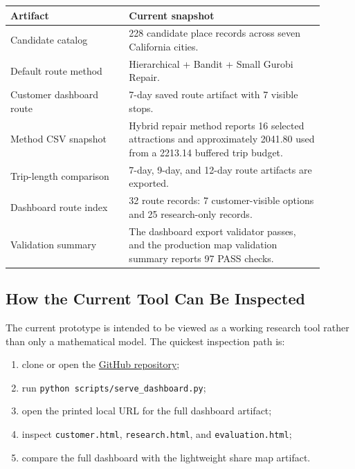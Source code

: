 \documentclass[11pt,a4paper]{article}
\begin{document}
\begin{center}
\begin{tabular}{p{0.34\linewidth} p{0.56\linewidth}}
\hline
\textbf{Artifact} & \textbf{Current snapshot} \\
\hline
Candidate catalog & 228 candidate place records across seven California cities. \\
Default route method & Hierarchical + Bandit + Small Gurobi Repair. \\
Customer dashboard route & 7-day saved route artifact with 7 visible stops. \\
Method CSV snapshot & Hybrid repair method reports 16 selected attractions and approximately 2041.80 used from a 2213.14 buffered trip budget. \\
Trip-length comparison & 7-day, 9-day, and 12-day route artifacts are exported. \\
Dashboard route index & 32 route records: 7 customer-visible options and 25 research-only records. \\
Validation summary & The dashboard export validator passes, and the production map validation summary reports 97 PASS checks. \\
\hline
\end{tabular}
\end{center}

\subsection*{How the Current Tool Can Be Inspected}

\noindent The current prototype is intended to be viewed as a working research tool rather than only a mathematical model. The quickest inspection path is:

\begin{enumerate}
    \item clone or open the \href{https://github.com/Ztang-Yit-Xiaang/weather-aware-travel-itinerary-optimization}{GitHub repository};
    \item run \texttt{python scripts/serve\_dashboard.py};
    \item open the printed local URL for the full dashboard artifact;
    \item inspect \texttt{customer.html}, \texttt{research.html}, and \texttt{evaluation.html};
    \item compare the full dashboard with the lightweight share map artifact.
\end{enumerate}
\end{document}
